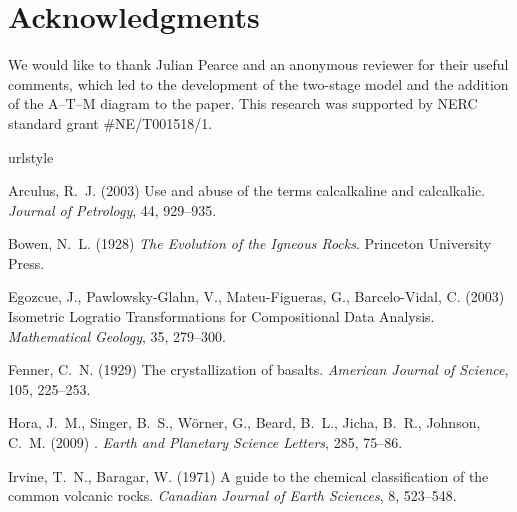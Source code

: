 \documentclass{article}
\begin{document}
\section*{Acknowledgments}

We would like to thank Julian Pearce and an anonymous reviewer for
their useful comments, which led to the development of the two-stage
model and the addition of the A--T--M diagram to the paper.  This
research was supported by NERC standard grant \#NE/T001518/1.

%
%

\begin{thebibliography}{15}
\providecommand{\natexlab}[1]{#1}
\providecommand{\url}[1]{\texttt{#1}}
\expandafter\ifx\csname urlstyle\endcsname\relax
  \providecommand{\doi}[1]{doi: #1}\else
  \providecommand{\doi}{doi: \begingroup \urlstyle{rm}\Url}\fi

Arculus, R.~J. (2003)
\newblock Use and abuse of the terms calcalkaline and calcalkalic.
\newblock \emph{Journal of Petrology}, 44, 929--935.

 Bowen, N.~L. (1928) \newblock
  \emph{The Evolution of the Igneous Rocks}.  \newblock Princeton
  University Press.

  Egozcue, J., Pawlowsky-Glahn, V., Mateu-Figueras, G., Barcelo-Vidal, C.
  (2003)
\newblock Isometric Logratio Transformations for Compositional Data Analysis.
\newblock \emph{Mathematical Geology}, 35, 279--300.

Fenner, C.~N. (1929)
\newblock The crystallization of basalts.
\newblock \emph{American Journal of Science}, 105, 225--253.

 Hora, J.~M., Singer, B.~S., W{\"o}rner, G.,
  Beard, B.~L., Jicha, B.~R., Johnson, C.~M. (2009) .  \newblock \emph{Earth and Planetary Science
    Letters}, 285, 75--86.

Irvine, T.~N., Baragar, W. (1971)
\newblock A guide to the chemical classification of the common volcanic rocks.
\newblock \emph{Canadian Journal of Earth Sciences}, 8, 523--548.


\end{thebibliography}
\end{document}
